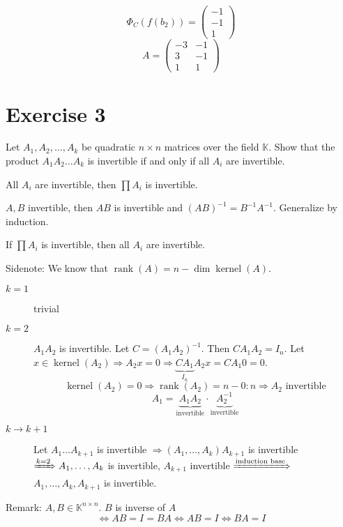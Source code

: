 \documentclass[a4paper]{article}
\theoremstyle{definition}
\DeclareMathOperator\kernel{kernel}
\begin{document}
\[ \Phi_C(f(b_2)) = \begin{pmatrix} -1 \\ -1 \\ 1 \end{pmatrix} \]
\[ A = \begin{pmatrix} -3 & -1 \\ 3 & -1 \\ 1 & 1 \end{pmatrix} \]


\section{Exercise 3}
\begin{ex}
  Let $A_1, A_2, \ldots, A_k$ be quadratic $n\times n$ matrices over the field $\mathbb K$.
  Show that the product $A_1 A_2 \ldots A_k$ is invertible if and only if all $A_i$ are invertible.
\end{ex}

All $A_i$ are invertible, then $\prod A_i$ is invertible.

$A, B$ invertible, then $AB$ is invertible and $(AB)^{-1} = B^{-1} A^{-1}$.
Generalize by induction.

If $\prod A_i$ is invertible, then all $A_i$ are invertible.

Sidenote: We know that $\operatorname{rank}(A) = n - \dim{\kernel(A)}$.

\begin{description}
  \item[$k=1$] trivial
  \item[$k=2$] $A_1 A_2$ is invertible. Let $C = (A_1 A_2)^{-1}$. Then $C A_1 A_2 = I_n$.
    Let $x \in \kernel(A_2) \Rightarrow A_2 x = 0 \Rightarrow \underbrace{C A_1}_{I_n} A_2 x = C A_1 0 = 0$.
    \[ \kernel(A_2) = 0 \Rightarrow \operatorname{rank}(A_2) = n - 0: n \Rightarrow A_2 \text{ invertible} \]
    \[ A_1 = \underbrace{A_1 A_2}_{\text{invertible}} \cdot \underbrace{A_2^{-1}}_{\text{invertible}} \]
  \item[$k \to k+1$]
    Let $A_1 \ldots A_{k+1}$ is invertible $\Rightarrow (A_1, \ldots, A_k) A_{k+1}$ is invertible $\xRightarrow{k=2} A_1, \ldots, A_k$ is invertible, $A_{k+1}$ invertible $\xRightarrow{\text{induction base}}$ $A_1, \ldots, A_k, A_{k+1}$ is invertible.
\end{description}

Remark:
$A,B \in \mathbb K^{n\times n}$. $B$ is inverse of $A$
\[ \Leftrightarrow AB = I = BA \Leftrightarrow AB = I \Leftrightarrow BA = I \]
\end{document}
